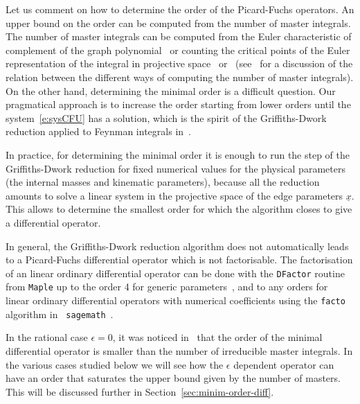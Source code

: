 \documentclass[a4paper,12pt]{article}
\numberwithin{equation}{section}
\numberwithin{figure}{section}
\begin{document}
\medskip
 
 Let us comment on how to determine the order of the Picard-Fuchs operators. An upper bound on the order can be computed
 from the number of master integrals.
 The number of master
integrals  can be computed from the Euler
characteristic of complement of the graph polynomial~\cite{Bitoun:2017nre} or counting the
critical points of the Euler representation of the integral in
projective
space~\cite{Lee:2013hzt,Cacciatori:2021nli}
or~\cite{Mastrolia:2018uzb,Frellesvig:2019uqt} (see~\cite{Agostini:2022cgv} for
a discussion of the relation between the different ways of computing the number of master
integrals). On the other hand, determining the minimal order is a
difficult question. Our pragmatical approach is to increase the order
starting from 
lower orders until the system~\eqref{e:sysCFU} has a solution, which is
the spirit of the Griffiths-Dwork reduction applied to Feynman
integrals in~\cite{Muller-Stach:2011qkg}.

In practice, for determining the minimal order it is enough to run the step of the
Griffiths-Dwork reduction for fixed numerical values for the physical
parameters (the internal masses and kinematic
parameters), because all the reduction amounts to solve a linear system in the projective space of
the edge parameters $\underline x$. This allows to determine the smallest order for which the
algorithm closes to give a differential operator.

In general, the Griffiths-Dwork reduction algorithm does not automatically
leads to a Picard-Fuchs differential operator  which is not factorisable. 
The factorisation of an linear ordinary
differential operator can be done with the {\tt DFactor} routine from
{\tt Maple} up to the order 4 for generic parameters~\cite{PutSinger,vanHoeij}, and to any
orders for linear  ordinary
differential operators with numerical coefficients
using the {\tt facto} algorithm in {\tt
	sagemath}~\cite{chyzak2022symbolic,goyer2021sage}.


 In the rational case $\epsilon=0$, it was noticed
in~\cite{Bloch:2013tra,Bloch:2016izu,Bloch:2014qca,Lairez:2022zkj} that the order of the minimal differential operator is
smaller than the number of irreducible master integrals. 
In the various cases studied below
we will see 
how the $\epsilon$ dependent operator can have an order that saturates
the upper bound given by the number of masters.  This will
      be discussed further in Section~\ref{sec:minim-order-diff}.


\end{document}
